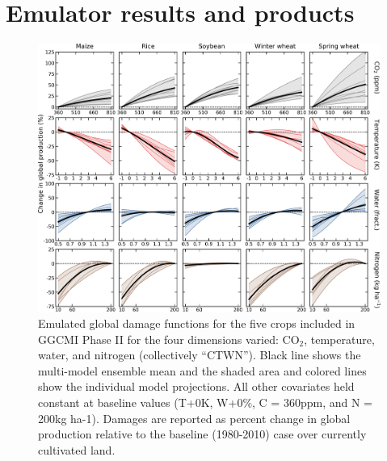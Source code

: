 \documentclass[gmd, manuscript]{copernicus} %
\begin{document}
\section{Emulator results and products}
\label{S:5}
\begin{figure}[ht]
  \centering
  \includegraphics[width = 16.3cm]{figures/em_CTWN_all_crops.png}
  \caption{
  Emulated global damage functions for the five crops included in GGCMI Phase II for the four dimensions varied: CO$_2$, temperature, water, and nitrogen (collectively ``CTWN''). 
  Black line shows the multi-model ensemble mean and the shaded area and colored lines show the individual model projections. 
  All other covariates held constant at baseline values (T+0K, W+0\%, C = 360ppm, and N = 200kg ha-1). 
  Damages are reported as percent change in global production relative to the baseline (1980-2010) case over currently cultivated land.
  }
  \label{fig:all_dims}
\end{figure}
\end{document}
